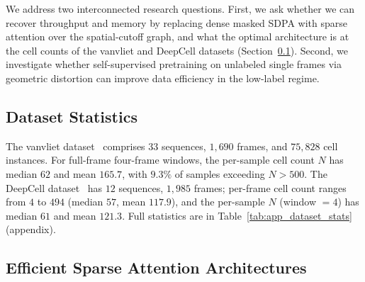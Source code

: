 We address two interconnected research questions. First, we ask whether we can recover throughput and memory by replacing dense masked SDPA with sparse attention over the spatial-cutoff graph, and what the optimal architecture is at the cell counts of the vanvliet and DeepCell datasets (Section~\ref{sec:dataset_stats}). Second, we investigate whether self-supervised pretraining on unlabeled single frames via geometric distortion can improve data efficiency in the low-label regime.

\subsection{Dataset Statistics}
\label{sec:dataset_stats}

The vanvliet dataset~\cite{vanvliet2018} comprises $33$ sequences, $1{,}690$ frames, and $75{,}828$ cell instances. For full-frame four-frame windows, the per-sample cell count $N$ has median $62$ and mean $165.7$, with $9.3\%$ of samples exceeding $N > 500$. The DeepCell dataset~\cite{schwartz2023} has $12$ sequences, $1{,}985$ frames; per-frame cell count ranges from $4$ to $494$ (median $57$, mean $117.9$), and the per-sample $N$ (window $= 4$) has median $61$ and mean $121.3$. Full statistics are in Table~\ref{tab:app_dataset_stats} (appendix).

\subsection{Efficient Sparse Attention Architectures}
\label{sec:sparse_attn}

